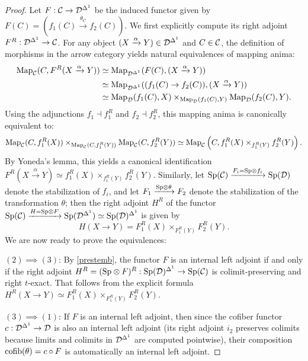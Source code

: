 \documentclass[a4paper,10pt, oneside]{amsart}
\begin{document}
\begin{proof}
	Let $F: \mathcal{C} \to \mathcal{D}^{\Delta^1}$ be the induced functor given by $F(C) = (f_1(C) \xrightarrow{\theta_C} f_2(C))$. We first explicitly compute its right adjoint $F^R: \mathcal{D}^{\Delta^1} \to \mathcal{C}$. For any object $(X \xrightarrow{\alpha} Y) \in \mathcal{D}^{\Delta^1}$ and $C \in \mathcal{C}$, the definition of morphisms in the arrow category yields natural equivalences of mapping anima:
	\begin{align*}
		\operatorname{Map}_{\mathcal{C}}(C, F^R(X \xrightarrow{\alpha} Y)) &\simeq \operatorname{Map}_{\mathcal{D}^{\Delta^1}}(F(C), (X \xrightarrow{\alpha} Y)) \\
		&\simeq \operatorname{Map}_{\mathcal{D}^{\Delta^1}}((f_1(C) \to f_2(C)), (X \xrightarrow{\alpha} Y)) \\
		&\simeq \operatorname{Map}_{\mathcal{D}}(f_1(C), X) \times_{\operatorname{Map}_{\mathcal{D}}(f_1(C), Y)} \operatorname{Map}_{\mathcal{D}}(f_2(C), Y).
	\end{align*}
	Using the adjunctions $f_1 \dashv f_1^R$ and $f_2 \dashv f_2^R$, this mapping anima is canonically equivalent to:
	$$ \operatorname{Map}_{\mathcal{C}}(C, f_1^R(X)) \times_{\operatorname{Map}_{\mathcal{C}}(C, f_1^R(Y))} \operatorname{Map}_{\mathcal{C}}(C, f_2^R(Y)) \simeq \operatorname{Map}_{\mathcal{C}}\left(C, f_1^R(X) \times_{f_1^R(Y)} f_2^R(Y)\right). $$
	By Yoneda's lemma, this yields a canonical identification $F^R(X \xrightarrow{\alpha} Y) \simeq f_1^R(X) \times_{f_1^R(Y)} f_2^R(Y)$. Similarly, let $ \mathrm{Sp}(\mathcal{C})\xrightarrow{F_i=\mathrm{Sp}\otimes f_i}\mathrm{Sp}(\mathcal{D})$ denote the stabilization of $f_i$,  and let $F_1\xrightarrow{\mathrm{Sp}\otimes \theta} F_2$ denote the stabilization of the transformation $\theta$; then the right adjoint $H^R$ of the functor $\mathrm{Sp}(\mathcal{C})\xrightarrow{H=\mathrm{Sp}\otimes F} \mathrm{Sp}(\mathcal{D}^{\Delta^1})\simeq \mathrm{Sp}(\mathcal{D})^{\Delta^1}$ is given by $$H(X\to Y)= F_1^R(X) \times_{F_1^R(Y)} F_2^R(Y).$$
	We are now ready to prove the equivalences:
	
$(2) \implies (3)$: By \cref{prestemb}, the functor $F$ is an internal left adjoint if and only if the right adjoint $H^R=(\mathrm{Sp}\otimes F)^R: \mathrm{Sp}(\mathcal{D})^{\Delta^1}\to \mathrm{Sp}(\mathcal{C})$ is colimit-preserving and right $t$-exact. That follows from the explicit formula $H^R(X \xrightarrow{} Y) \simeq F_1^R(X) \times_{F_1^R(Y)} F_2^R(Y)$.

	
	$(3) \implies (1)$: If $F$ is an internal left adjoint, then since the cofiber functor $c: \mathcal{D}^{\Delta^1} \to \mathcal{D}$ is also an internal left adjoint (its right adjoint $i_2$ preserves colimits because limits and colimits in $\mathcal{D}^{\Delta^1}$ are computed pointwise), their composition $\mathrm{cofib}(\theta) = c \circ F$ is automatically an internal left adjoint.
	

\end{proof}
\end{document}
